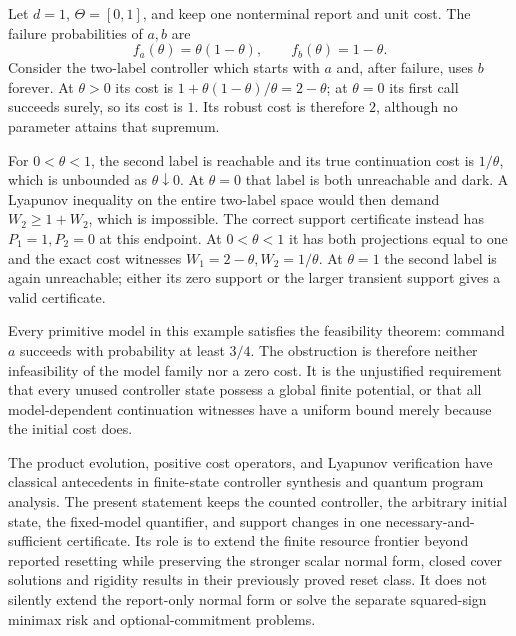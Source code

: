 \begin{example}
\label{ex:r79-unbounded-reachable-witness}
Let $d=1$, $\Theta=[0,1]$, and keep one nonterminal report and unit
cost.  The failure probabilities of $a,b$ are
\[
 f_a(\theta)=\theta(1-\theta),\qquad f_b(\theta)=1-\theta.
\]
Consider the two-label controller which starts with $a$ and, after
failure, uses $b$ forever.  At $\theta>0$ its cost is
$1+\theta(1-\theta)/\theta=2-\theta$; at $\theta=0$ its first
call succeeds surely, so its cost is $1$.  Its robust cost is
therefore $2$, although no parameter attains that supremum.

For $0<\theta<1$, the second label is reachable and its true
continuation cost is $1/\theta$, which is unbounded as
$\theta\downarrow0$.  At $\theta=0$ that label is both unreachable
and dark.  A Lyapunov inequality on the entire two-label space would
then demand $W_2\ge1+W_2$, which is impossible.  The correct support
certificate instead has $P_1=1,P_2=0$ at this endpoint.  At $0<\theta<1$ it has both projections equal to one and the exact cost
witnesses $W_1=2-\theta,W_2=1/\theta$.  At $\theta=1$ the second label is again unreachable; either its zero support or the larger transient support gives a valid certificate.

Every primitive model in this example satisfies the feasibility
theorem: command $a$ succeeds with probability at least $3/4$.
The obstruction is therefore neither infeasibility of the model
family nor a zero cost.  It is the unjustified requirement that
every unused controller state possess a global finite potential,
or that all model-dependent continuation witnesses have a uniform
bound merely because the initial cost does.
\end{example}

The product evolution, positive cost operators, and Lyapunov
verification have classical antecedents in finite-state controller
synthesis and quantum program analysis.  The present statement keeps
the counted controller, the arbitrary initial state, the fixed-model
quantifier, and support changes in one necessary-and-sufficient
certificate.  Its role is to extend the finite resource frontier
beyond reported resetting while preserving the stronger scalar
normal form, closed cover solutions and rigidity results in their
previously proved reset class.  It does not silently extend the
report-only normal form or solve the separate squared-sign minimax
risk and optional-commitment problems.

